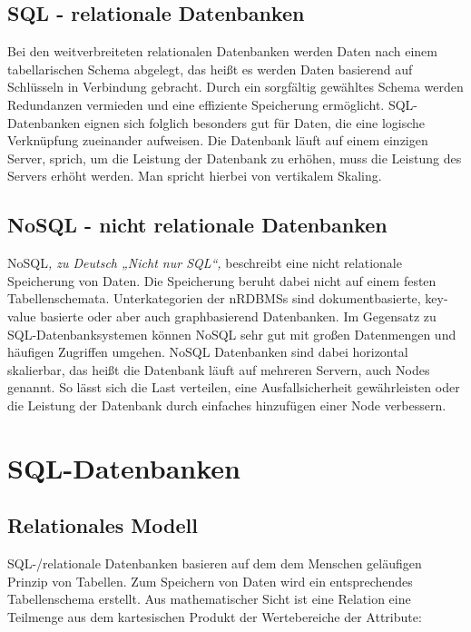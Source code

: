 \documentclass[12pt, a4paper, twoside]{article}
\begin{document}
	\subsection{SQL - relationale Datenbanken}
		Bei den weitverbreiteten relationalen Datenbanken werden Daten nach einem tabellarischen Schema abgelegt, das heißt es werden Daten basierend auf Schlüsseln in Verbindung gebracht. Durch ein sorgfältig gewähltes Schema werden Redundanzen vermieden und eine effiziente Speicherung ermöglicht. SQL-Datenbanken eignen sich folglich besonders gut für Daten, die eine logische Verknüpfung zueinander aufweisen. Die Datenbank läuft auf einem einzigen Server, sprich, um die Leistung der Datenbank zu erhöhen, muss die Leistung des Servers erhöht werden. Man spricht hierbei von vertikalem Skaling. 
		\cite{ibm-sql-nosql}\cite{Meier:SQLNoSQLDatenbanken}
	\subsection{NoSQL - nicht relationale Datenbanken}
		NoSQL\textit{, zu Deutsch „Nicht nur SQL“, }beschreibt eine nicht relationale Speicherung von Daten. Die Speicherung beruht dabei nicht auf einem festen Tabellenschemata. Unterkategorien der \acp{nRDBMS} sind dokumentbasierte, key-value basierte oder aber auch graphbasierend Datenbanken. Im Gegensatz zu SQL-Datenbanksystemen können NoSQL sehr gut mit großen Datenmengen und häufigen Zugriffen umgehen. NoSQL Datenbanken sind dabei horizontal skalierbar, das heißt die Datenbank läuft auf mehreren Servern, auch Nodes genannt. So lässt sich die Last verteilen, eine Ausfallsicherheit gewährleisten oder die Leistung der Datenbank durch einfaches hinzufügen einer Node verbessern. 
		\cite{ibm-sql-nosql} \cite{Meier:SQLNoSQLDatenbanken}
		
\section{SQL-Datenbanken}
	\subsection{Relationales Modell}
		SQL-/relationale Datenbanken basieren auf dem dem Menschen geläufigen Prinzip von Tabellen. Zum Speichern von Daten wird ein entsprechendes Tabellenschema erstellt. Aus mathematischer Sicht ist eine Relation eine Teilmenge aus dem kartesischen Produkt der Wertebereiche der Attribute:
		
\end{document}
